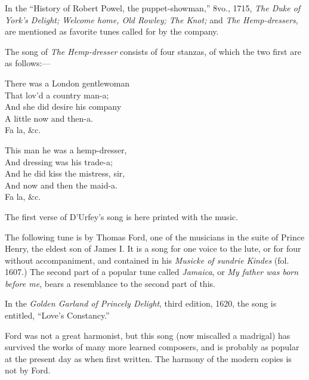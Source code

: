 In the “History of Robert Powel, the puppet-showman,” 8vo., 1715, \textit{The
Duke of York’s Delight; Welcome home, Old Rowley; The Knot;} and \textit{The Hemp-dressers}, 
are mentioned as favorite tunes called for by the company.

The song of \textit{The Hemp-dresser} consists of four stanzas, of which the two first
are as follows:—

\settowidth{\versewidth}{There was a London gentlewoman}
\begin{dcverse}
\begin{patverse}
There was a London gentlewoman\\
That lov’d a country man-a;\\
And she did desire his company\\
A little now and then-a.\\
Fa la, \&c.
\end{patverse}

\begin{patverse}
This man he was a hemp-dresser,\\
And dressing was his trade-a;\\
And he did kiss the mistress, sir,\\
And now and then the maid-a.\\
Fa la, \&c.
\end{patverse}
\end{dcverse}

The first verse of D’Urfey’s song is here printed with the music.





The following tune is by Thomas Ford, one of the musicians in the suite of
Prince Henry, the eldest son of James I. It is a song for one voice to the lute,
or for four without accompaniment, and contained in his \textit{Musicke of sundrie
Kindes} (fol. 1607.) The second part of a popular tune called \textit{Jamaica}, or \textit{My
father was born before me}, bears a resemblance to the second part of this.

In the \textit{Golden Garland of Princely Delight}, third edition, 1620, the song is
entitled, “Love’s Constancy.”
\pagebreak

Ford was not a great harmonist, but this song (now miscalled a madrigal) has
survived the works of many more learned composers, and is probably as popular
at the present day as when first written. The harmony of the modern copies is
not by Ford.

